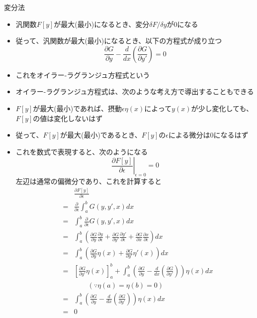 \documentclass[dvipdfmx,notheorems,t]{beamer}
\begin{document}
\begin{frame}{変分法}
\begin{itemize}
\begin{itemize}
		\item 汎関数$F[y]$が最大(最小)になるとき、変分$\delta F/\delta y$が$0$になる
		\item 従って、汎関数が最大(最小)になるとき、以下の方程式が成り立つ
		\begin{equation}
			\frac{\partial G}{\partial y} - \frac{d}{dx} \left( \frac{\partial G}{\partial y'} \right) = 0
		\end{equation}
		
		\item これを\alert{オイラー-ラグランジュ方程式}という
		\newline
		
		\item オイラー-ラグランジュ方程式は、次のような考え方で導出することもできる
		\newline
		\item $F[y]$が最大(最小)であれば、摂動$\epsilon \eta(x)$によって$y(x)$が少し変化しても、$F[y]$の値は変化しないはず
		\item 従って、$F[y]$が最大(最小)であるとき、\color{red}$F[y]$の$\epsilon$による微分は$0$になるはず\normalcolor
		
		\item これを数式で表現すると、次のようになる
		\begin{equation}
			\left. \frac{\partial F[y]}{\partial \epsilon} \right|_{\epsilon = 0} = 0
		\end{equation}
		左辺は通常の偏微分であり、これを計算すると
		\begin{eqnarray}
			&& \frac{\partial F[y]}{\partial \epsilon} \nonumber \\
			&=& \frac{\partial}{\partial \epsilon} \int_a^b G(y, y', x) dx \\
			&=& \int_a^b \frac{\partial}{\partial \epsilon} G(y, y', x) dx \\
			&=& \int_a^b \left( \frac{\partial G}{\partial y} \frac{\partial y}{\partial \epsilon} + \frac{\partial G}{\partial y'} \frac{\partial y'}{\partial \epsilon} + \frac{\partial G}{\partial x} \frac{\partial x}{\partial \epsilon} \right) dx \\
			&=& \int_a^b \left( \frac{\partial G}{\partial y} \eta(x) + \frac{\partial G}{\partial y'} \eta'(x) \right) dx \\
			&=& \left[ \frac{\partial G}{\partial y'} \eta(x) \right]_a^b + \int_a^b \left( \frac{\partial G}{\partial y} - \frac{d}{dx} \left( \frac{\partial G}{\partial y'} \right) \right) \eta(x) dx \\
			&& \qquad (\because \eta(a) = \eta(b) = 0) \nonumber \\
			&=& \int_a^b \left( \frac{\partial G}{\partial y} - \frac{d}{dx} \left( \frac{\partial G}{\partial y'} \right) \right) \eta(x) dx \\
			&=& 0 \nonumber
		\end{eqnarray}
		

\end{itemize}
\end{itemize}
\end{frame}
\end{document}
